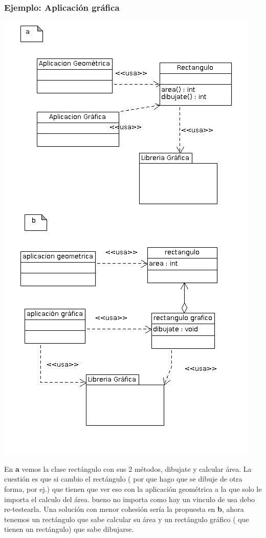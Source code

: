 \documentclass[10pt,a4paper]{article}
\begin{document}
\subsubsection{Ejemplo: Aplicación gráfica}
\includegraphics[scale=0.5]{./img/aplicacion-grafica-geometrica.png} 

En \textbf{a} vemos la clase rectángulo con sus 2 métodos, dibujate y calcular área.
La cuestión es que si cambio el rectángulo ( por que hago que se dibuje de otra forma, por ej.)
que tienen que ver eso con la aplicación geométrica  a la que solo le importa el calculo del área.
bueno no importa como hay un vinculo de usa debo re-testearla.
Una solución con menor cohesión sería la propuesta en \textbf{b}, ahora tenemos un  rectángulo que sabe calcular su área y un rectángulo gráfico ( que tienen un rectángulo) que sabe dibujarse.
\end{document}
